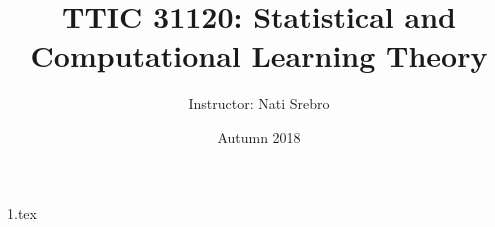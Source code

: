 \documentclass{article}
\begin{document}
\title{TTIC 31120: Statistical and Computational Learning Theory}
\date{Autumn 2018}
\author{Instructor: Nati Srebro}
\maketitle

\tableofcontents
\eject


{1.tex}
\end{document}

